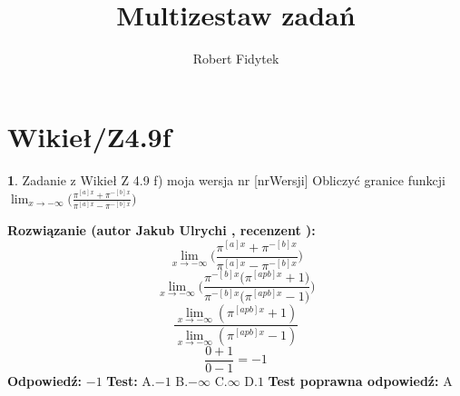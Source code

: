\documentclass[12pt, a4paper]{article}
\title{Multizestaw zadań}
\author{Robert Fidytek}
\date{}
\theoremstyle{definition} %
\newtheorem{zad}{}
\newcommand{\kategoria}[1]{\section{#1}} %
\newcommand{\zadStart}[1]{\begin{zad}#1\newline} %
\newcommand{\zadStop}{\end{zad}}   %
\newcommand{\rozwStart}[2]{\noindent \textbf{Rozwiązanie (autor #1 , recenzent #2): }\newline} %
\newcommand{\odpStart}{\noindent \textbf{Odpowiedź:}\newline}    %
\newcommand{\odpStop}{\newline}                                             %
\newcommand{\testStart}{\noindent \textbf{Test:}\newline} %
\newcommand{\testStop}{\newline} %
\newcommand{\kluczStart}{\noindent \textbf{Test poprawna odpowiedź:}\newline} %
\newcommand{\kluczStop}{\newline} %
\begin{document}
\maketitle


\kategoria{Wikieł/Z4.9f}
\zadStart{Zadanie z Wikieł Z 4.9 f) moja wersja nr [nrWersji]}
Obliczyć granice funkcji $\lim_{x \to -\infty}\bigg(\frac{\pi^{[a]x}+\pi^{-[b]x}}{\pi^{[a]x}-\pi^{-[b]x}}\bigg)$
\zadStop
\rozwStart{Jakub Ulrychi}{}
$$\lim_{x \to -\infty}\bigg(\frac{\pi^{[a]x}+\pi^{-[b]x}}{\pi^{[a]x}-\pi^{-[b]x}}\bigg)$$
$$\lim_{x \to -\infty}\bigg(\frac{\pi^{-[b]x}\big(\pi^{[apb]x}+1\big)}{\pi^{-[b]x}\big(\pi^{[apb]x}-1\big)}\bigg)$$
$$\frac{\lim_{x \to -\infty}(\pi^{[apb]x}+1)}{\lim_{x \to -\infty}(\pi^{[apb]x}-1)}$$
$$\frac{0+1}{0-1}=-1$$
\odpStart
$-1$
\odpStop
\testStart
A.$-1$
B.$-\infty$
C.$\infty$
D.$1$
\testStop
\kluczStart
A
\kluczStop
\end{document}
